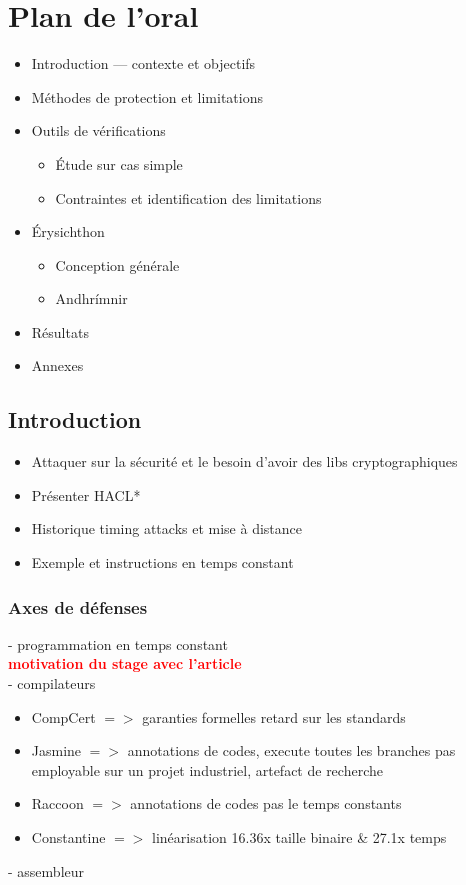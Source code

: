 \documentclass[10pt,a5paper]{article}
\newcommand{\important}[1]{\textbf{\textcolor{red}{#1}}}
\begin{document}
\section*{Plan de l'oral}

\begin{itemize}
  \item Introduction — contexte et objectifs
  \item Méthodes de protection et limitations
  \item Outils de vérifications
  \begin{itemize}
    \item Étude sur cas simple
    \item Contraintes et identification des limitations
  \end{itemize}
  \item Érysichthon
  \begin{itemize}
    \item Conception générale
    \item Andhrímnir
  \end{itemize}
  \item Résultats
  \item Annexes
\end{itemize}

\subsection*{Introduction}
\begin{multicols}{2}
  \begin{itemize}
    \item Attaquer sur la sécurité et le besoin d'avoir des libs cryptographiques
    \item Présenter HACL*
    \item Historique timing attacks et mise à distance
    \item Exemple et instructions en temps constant
  \end{itemize}
\end{multicols}

\subsubsection*{Axes de défenses}
- programmation en temps constant \\
\important{motivation du stage avec l'article}\\
- compilateurs
\begin{itemize}
  \item CompCert $=>$ garanties formelles \dotfill retard sur les standards
  \item Jasmine $=>$ annotations de codes, execute toutes les branches \dotfill pas employable sur un projet industriel, artefact de recherche
  \item Raccoon $=>$ annotations de codes \dotfill pas le temps constants
  \item Constantine $=>$ linéarisation \dotfill 16.36x taille binaire \& 27.1x temps
\end{itemize}
- assembleur\\
\end{document}
